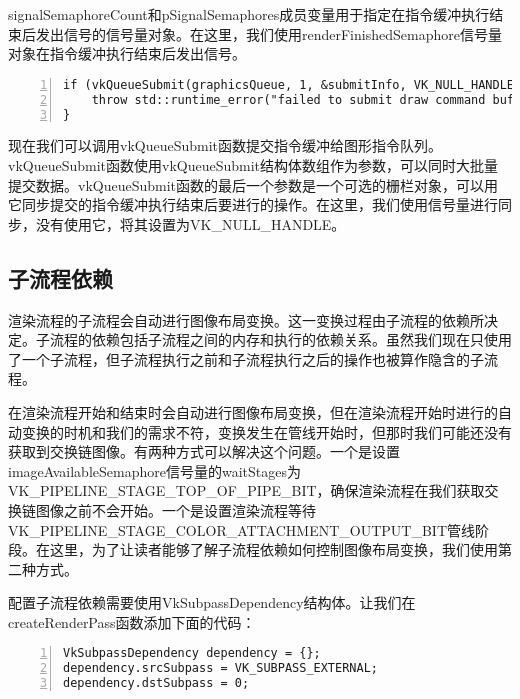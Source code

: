\documentclass{ctexart}
\begin{document}
signalSemaphoreCount和pSignalSemaphores成员变量用于指定在指令缓冲执行结束后发出信号的信号量对象。在这里，我们使用renderFinishedSemaphore信号量对象在指令缓冲执行结束后发出信号。

\begin{lstlisting}[language={[ANSI]C},keywordstyle=\color{blue!70},commentstyle=\color{red!50!green!50!blue!50},frame=shadowbox, rulesepcolor=\color{red!20!green!20!blue!20},basicstyle=\small,numbers=left, numberstyle=\tiny,breaklines=true]
if (vkQueueSubmit(graphicsQueue, 1, &submitInfo, VK_NULL_HANDLE) != VK_SUCCESS) {
	throw std::runtime_error("failed to submit draw command buffer!");
}
\end{lstlisting}

现在我们可以调用vkQueueSubmit函数提交指令缓冲给图形指令队列。vkQueueSubmit函数使用vkQueueSubmit结构体数组作为参数，可以同时大批量提交数据。vkQueueSubmit函数的最后一个参数是一个可选的栅栏对象，可以用它同步提交的指令缓冲执行结束后要进行的操作。在这里，我们使用信号量进行同步，没有使用它，将其设置为VK\_NULL\_HANDLE。

\subsection{子流程依赖}

渲染流程的子流程会自动进行图像布局变换。这一变换过程由子流程的依赖所决定。子流程的依赖包括子流程之间的内存和执行的依赖关系。虽然我们现在只使用了一个子流程，但子流程执行之前和子流程执行之后的操作也被算作隐含的子流程。

在渲染流程开始和结束时会自动进行图像布局变换，但在渲染流程开始时进行的自动变换的时机和我们的需求不符，变换发生在管线开始时，但那时我们可能还没有获取到交换链图像。有两种方式可以解决这个问题。一个是设置imageAvailableSemaphore信号量的waitStages为VK\_PIPELINE\_STAGE\_TOP\_OF\_PIPE\_BIT，确保渲染流程在我们获取交换链图像之前不会开始。一个是设置渲染流程等待VK\_PIPELINE\_STAGE\_COLOR\_ATTACHMENT\_OUTPUT\_BIT管线阶段。在这里，为了让读者能够了解子流程依赖如何控制图像布局变换，我们使用第二种方式。

配置子流程依赖需要使用VkSubpassDependency结构体。让我们在createRenderPass函数添加下面的代码：

\begin{lstlisting}[language={[ANSI]C},keywordstyle=\color{blue!70},commentstyle=\color{red!50!green!50!blue!50},frame=shadowbox, rulesepcolor=\color{red!20!green!20!blue!20},basicstyle=\small,numbers=left, numberstyle=\tiny,breaklines=true]
VkSubpassDependency dependency = {};
dependency.srcSubpass = VK_SUBPASS_EXTERNAL;
dependency.dstSubpass = 0;
\end{lstlisting}
\end{document}
